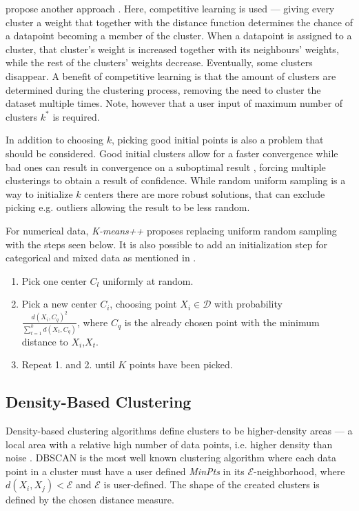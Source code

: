 \documentclass[../report.tex]{subfiles}
\begin{document}
\citeauthor{Cheung2013} propose another approach \cite{Cheung2013, Jia2018}. Here, competitive learning is used --- giving every cluster a weight that together with the distance function determines the chance of a datapoint becoming a member of the cluster. When a datapoint is assigned to a cluster, that cluster's weight is increased together with its neighbours' weights, while the rest of the clusters' weights decrease. Eventually, some clusters disappear. A benefit of competitive learning is that the amount of clusters are determined during the clustering process, removing the need to cluster the dataset multiple times. Note, however that a user input of maximum number of clusters $\mathit{k^*}$ is required.

In addition to choosing $k$, picking good initial points is also a problem that should be considered. Good initial clusters allow for a faster convergence while bad ones can result in convergence on a suboptimal result \cite{Arthur2006, Jia2018}, forcing multiple clusterings to obtain a result of confidence. While random uniform sampling is a way to initialize $k$ centers there are more robust solutions, that can exclude picking e.g. outliers allowing the result to be less random.

For numerical data, \textit{K-means++} \cite{Arthur2006} proposes replacing uniform random sampling with the steps seen below. It is also possible to add an initialization step for categorical and mixed data as mentioned in \cite{Jia2018}.

\begin{enumerate}
\label{eq:plusplus}
  \item Pick one center $C_l$ uniformly at random.
  \item Pick a new center $C_i$, choosing point $X_i \in \mathcal{D}$ with probability \\ $\frac{d(X_i,C_q)^2}{\sum_{t=1}^{k}{d(X_t,C_q)}}$, where $C_q$ is the already chosen point with the minimum distance to $X_i$,$X_t$.
  \item Repeat 1. and 2. until $K$ points have been picked.
\end{enumerate}

\subsection{Density-Based Clustering}
\label{sub:density}
Density-based clustering algorithms define clusters to be higher-density areas --- a local area with a relative high number of data points, i.e. higher density than noise  \cite{Ester1996, huang2005automated, Xu2015,Jain1999}. DBSCAN \cite{Ester1996} is the most well known clustering algorithm where each data point in a cluster must have a user defined \textit{MinPts} in its $\mathcal{E}$-neighborhood, where $d(X_i,X_j) < \mathcal{E}$ and $\mathcal{E}$ is user-defined. The shape of the created clusters is defined by the chosen distance measure.
\end{document}

